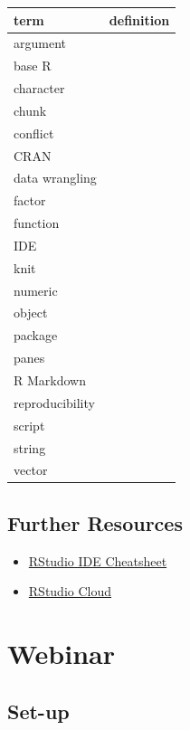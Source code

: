\documentclass[
  oneside]{book}
\providecommand{\tightlist}{%
  \setlength{\itemsep}{0pt}\setlength{\parskip}{0pt}}
\begin{document}
\begin{table}
\centering
\begin{tabular}{l|l}
\hline
term & definition\\
\hline
argument & \\
\hline
base R & \\
\hline
character & \\
\hline
chunk & \\
\hline
conflict & \\
\hline
CRAN & \\
\hline
data wrangling & \\
\hline
factor & \\
\hline
function & \\
\hline
IDE & \\
\hline
knit & \\
\hline
numeric & \\
\hline
object & \\
\hline
package & \\
\hline
panes & \\
\hline
R Markdown & \\
\hline
reproducibility & \\
\hline
script & \\
\hline
string & \\
\hline
vector & \\
\hline
\end{tabular}
\end{table}

\section{Further Resources}\label{resources-intro}

\begin{itemize}
\tightlist
\item
  \href{https://raw.githubusercontent.com/rstudio/cheatsheets/main/rstudio-ide.pdf}{RStudio IDE Cheatsheet}
\item
  \href{https://rstudio.cloud/}{RStudio Cloud}
\end{itemize}

\chapter{Webinar}\label{webinar}

\section{Set-up}\label{set-up}
\end{document}
